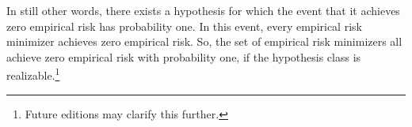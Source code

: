 In still other words, there exists a hypothesis for which the event that it achieves zero empirical risk has probability one.
In this event, every empirical risk minimizer achieves zero empirical risk.
So, the set of empirical risk minimizers all achieve zero empirical risk with probability one, if the hypothesis class is realizable.\footnote{Future editions may clarify this further.}

